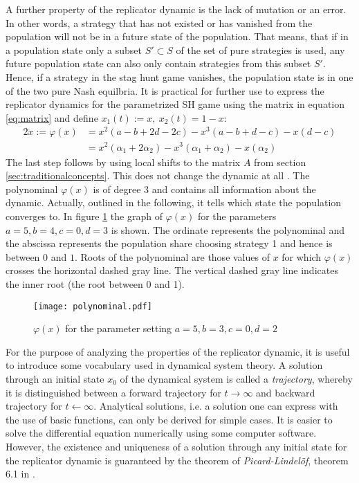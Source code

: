 A further property of the replicator dynamic is the lack of mutation or 
an error. In other words, a strategy that has not existed or has 
vanished from the population will not be in a future state of the population. 
That means, that if in a population state only a subset $S' \subset S$ of the 
set of pure strategies is used, any future population state can also only 
contain strategies from this subset $S'$. Hence, if a strategy in 
the stag hunt game vanishes, the population state is in one of the two pure 
Nash equilbria. It is practical for further use to express the replicator 
dynamics for the parametrized SH game using the matrix in equation 
\eqref{eq:matrix} and define $x_1(t) := x,\ x_2(t) = 1-x$:
\begin{alignat}{2}
        \label{eq:replicatorpara}
        \dot{x} := \varphi(x) &= x^2(a-b+2d-2c) - x^3(a-b+d-c) -x(d-c) \\
                              &= x^2(\alpha_1+2\alpha_2) 
        - x^3(\alpha_1+\alpha_2) - x(\alpha_2)
\end{alignat}
The last step follows by using local shifts to the matrix $A$ from section
\ref{sec:traditionalconcepts}. This does not change the dynamic at all 
\parencite[73]{weibull_evolutionary_1997}. The polynominal $\varphi(x)$ is
of degree $3$ and contains all information about the dynamic. Actually, 
outlined in the following, it tells which state the population converges to.
In figure \ref{fig:polynominal} the graph of $\varphi(x)$ for the parameters
$a=5, b=4,c=0,d=3$ is shown. The ordinate represents the polynominal and
the abscissa represents the population share choosing strategy 1 and hence is
between $0$ and $1$. Roots of the polynominal are those values of $x$ for 
which $\varphi(x)$ crosses the horizontal dashed gray line. The vertical
dashed gray line indicates the inner root (the root between 0 and 1).

\begin{figure}[h]
        \centering
        \texttt{[image: polynominal.pdf]}
        \caption[Polynominal of the Replicator Dynamic]{$\varphi(x)$ for the parameter setting $a=5, b=3, c=0, d=2$}
        \label{fig:polynominal}
\end{figure}
For the purpose of analyzing the properties of the replicator dynamic, it is 
useful to introduce some vocabulary used in dynamical system theory. 
A solution through an initial state $x_0$ of the dynamical system is called a 
\textit{trajectory}, whereby it is distinguished between a forward trajectory 
for $t \rightarrow \infty$ and backward trajectory for $t \leftarrow \infty$.
Analytical solutions, i.e. a solution one can express with the use of
basic functions, can only be derived for simple cases. 
It is easier to solve the differential equation numerically using some
computer software. 
However, the existence and uniqueness of a solution through
any initial state for the replicator dynamic is guaranteed by the theorem 
of \textit{Picard-Lindel\"of}, theorem 6.1 in 
\textcite[74]{weibull_evolutionary_1997}. 

